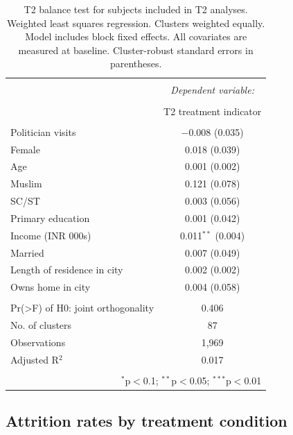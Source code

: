 \documentclass[
  11.5pt,
]{article}
\begin{document}
\begin{table}[!htbp] \centering 
  \caption{T2 balance test for subjects included in T2 analyses. Weighted least squares regression. Clusters weighted equally. Model includes block fixed effects. All covariates are measured at baseline. Cluster-robust standard errors in parentheses.} 
  \label{} 
\small 
\begin{tabular}{@{\extracolsep{5pt}}lc} 
\\[-1.8ex]\hline 
\hline \\[-1.8ex] 
 & \multicolumn{1}{c}{\textit{Dependent variable:}} \\ 
\cline{2-2} 
\\[-1.8ex] & T2 treatment indicator \\ 
\hline \\[-1.8ex] 
 Politician visits & $-$0.008 (0.035) \\ 
  Female & 0.018 (0.039) \\ 
  Age & 0.001 (0.002) \\ 
  Muslim & 0.121 (0.078) \\ 
  SC/ST & 0.003 (0.056) \\ 
  Primary education & 0.001 (0.042) \\ 
  Income (INR 000s) & 0.011$^{**}$ (0.004) \\ 
  Married & 0.007 (0.049) \\ 
  Length of residence in city & 0.002 (0.002) \\ 
  Owns home in city & 0.004 (0.058) \\ 
 \hline \\[-1.8ex] 
Pr(>F) of H0: joint orthogonality & 0.406 \\ 
No. of clusters & 87 \\ 
Observations & 1,969 \\ 
Adjusted R$^{2}$ & 0.017 \\ 
\hline 
\hline \\[-1.8ex] 
\multicolumn{2}{r}{$^{*}$p$<$0.1; $^{**}$p$<$0.05; $^{***}$p$<$0.01} \\ 
\end{tabular} 
\end{table}

\clearpage

\subsection{Attrition rates by treatment condition}
\end{document}

